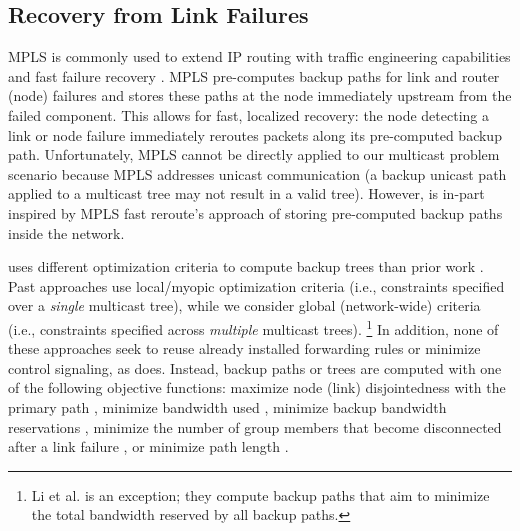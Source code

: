 \subsection{Recovery from Link Failures}
\label{subsec:related-recovery}


MPLS is commonly used to extend IP routing with traffic engineering capabilities and fast failure recovery \cite{Rosen01}.  
MPLS pre-computes backup paths for link and router (node) failures and stores these paths at the node immediately upstream from the failed component. 
This allows for fast, localized recovery: the node detecting a link or node failure immediately reroutes packets along its pre-computed backup path.  
Unfortunately, MPLS cannot be directly applied to our multicast problem scenario because MPLS addresses unicast communication (a backup unicast path applied to a multicast tree may not
result in a valid tree).
However, \pre is in-part inspired by MPLS fast reroute's approach of storing pre-computed backup paths inside the network.



\mc uses different optimization criteria to compute backup trees than prior work \cite{Cui04,Fei01,Kodialam02,Lau05,Li06,Luebben09,Medard99,Pointurier02,Wu97}.
Past approaches use local/myopic optimization criteria (i.e., constraints specified over a \emph{single} multicast tree),
while we consider global (network-wide) criteria (i.e., constraints specified across \emph{multiple} multicast trees).  
\footnote{Li et al. \cite{Li06} is an exception; they compute backup paths that aim to minimize the total bandwidth reserved by all backup paths.}
In addition, none of these approaches seek to reuse already installed forwarding rules or minimize control signaling, as \mc does.
Instead, backup paths or trees are computed with one of the following objective functions: maximize node (link) disjointedness with the primary 
path \cite{Cui04,Fei01,Luebben09,Medard99}, minimize bandwidth used \cite{Wu97}, minimize backup bandwidth reservations \cite{Kodialam02,Lau05,Li06}, minimize the number of group
members that become disconnected after a link failure \cite{Pointurier02}, or minimize path length \cite{Tian05}.


